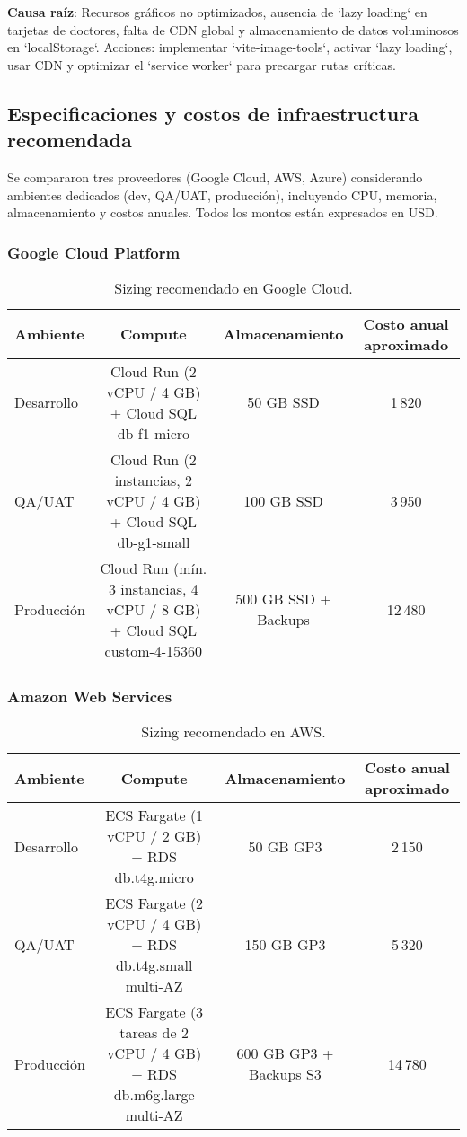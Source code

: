 \documentclass[12pt,a4paper]{article}
\begin{document}
\textbf{Causa raíz}: Recursos gráficos no optimizados, ausencia de `lazy loading` en tarjetas de doctores, falta de CDN global y almacenamiento de datos voluminosos en `localStorage`. Acciones: implementar `vite-image-tools`, activar `lazy loading`, usar CDN y optimizar el `service worker` para precargar rutas críticas.

\subsection{Especificaciones y costos de infraestructura recomendada}

Se compararon tres proveedores (Google Cloud, AWS, Azure) considerando ambientes dedicados (dev, QA/UAT, producción), incluyendo CPU, memoria, almacenamiento y costos anuales. Todos los montos están expresados en USD.

\subsubsection{Google Cloud Platform}

\begin{table}[htbp]
    \centering
    \caption{Sizing recomendado en Google Cloud.}\label{tab:gcp-costos}
    \begin{tabular}{lccc}
        \toprule
        Ambiente & Compute & Almacenamiento & Costo anual aproximado \\
        \midrule
        Desarrollo & Cloud Run (2 vCPU / 4 GB) + Cloud SQL db-f1-micro & 50 GB SSD & 1\,820 \\
        QA/UAT & Cloud Run (2 instancias, 2 vCPU / 4 GB) + Cloud SQL db-g1-small & 100 GB SSD & 3\,950 \\
        Producción & Cloud Run (mín. 3 instancias, 4 vCPU / 8 GB) + Cloud SQL custom-4-15360 & 500 GB SSD + Backups & 12\,480 \\
        \bottomrule
    \end{tabular}
\end{table}

\subsubsection{Amazon Web Services}

\begin{table}[htbp]
    \centering
    \caption{Sizing recomendado en AWS.}\label{tab:aws-costos}
    \begin{tabular}{lccc}
        \toprule
        Ambiente & Compute & Almacenamiento & Costo anual aproximado \\
        \midrule
        Desarrollo & ECS Fargate (1 vCPU / 2 GB) + RDS db.t4g.micro & 50 GB GP3 & 2\,150 \\
        QA/UAT & ECS Fargate (2 vCPU / 4 GB) + RDS db.t4g.small multi-AZ & 150 GB GP3 & 5\,320 \\
        Producción & ECS Fargate (3 tareas de 2 vCPU / 4 GB) + RDS db.m6g.large multi-AZ & 600 GB GP3 + Backups S3 & 14\,780 \\
        \bottomrule
    \end{tabular}
\end{table}
\end{document}
